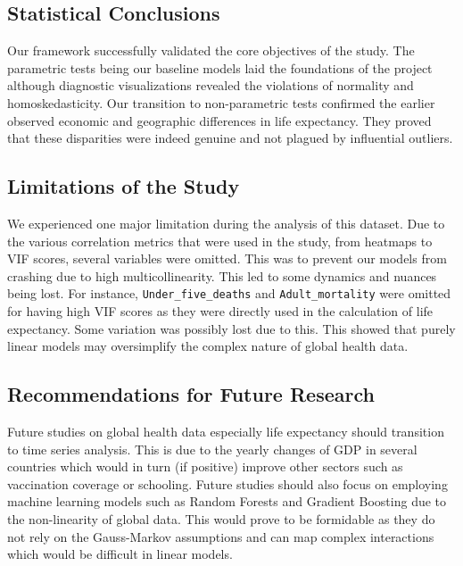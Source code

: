 \documentclass[3pt, a4paper]{article}
\begin{document}
\subsection{Statistical Conclusions}
Our framework successfully validated the core objectives of the study. The parametric tests being our baseline models laid the foundations of the project although diagnostic visualizations revealed the violations of normality and homoskedasticity. Our transition to non-parametric tests confirmed the earlier observed economic and geographic differences in life expectancy. They proved that these disparities were indeed genuine and not plagued by influential outliers. 

\subsection{Limitations of the Study}
We experienced one major limitation during the analysis of this dataset. Due to the various correlation metrics that were used in the study, from heatmaps to VIF scores, several variables were omitted. This was to prevent our models from crashing due to high multicollinearity. This led to some dynamics and nuances being lost. For instance, \texttt{Under\_five\_deaths} and \texttt{Adult\_mortality} were omitted for having high VIF scores as they were directly used in the calculation of life expectancy. Some variation was possibly lost due to this. This showed that purely linear models may oversimplify the complex nature of global health data.

\subsection{Recommendations for Future Research}
Future studies on global health data especially life expectancy should transition to time series analysis. This is due to the yearly changes of GDP in several countries which would in turn (if positive) improve other sectors such as vaccination coverage or schooling. Future studies should also focus on employing machine learning models such as Random Forests and Gradient Boosting due to the non-linearity of global data. This would prove to be formidable as they do not rely on the Gauss-Markov assumptions and can map complex interactions which would be difficult in linear models.



\end{document}
